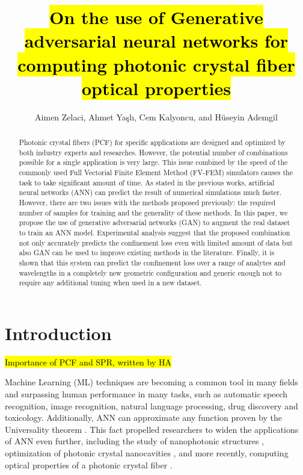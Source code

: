 \documentclass[10pt]{IEEEtran}
\begin{document}
\title{\hl{On the use of Generative adversarial neural networks for computing photonic crystal fiber optical properties}}

\author{Aimen Zelaci, Ahmet Yaşlı, Cem Kalyoncu, and Hüseyin Ademgil}

\maketitle
	
\begin{abstract}
Photonic crystal fibers (PCF) for specific applications are designed and optimized by both industry experts and researches. However, the potential number of combinations possible for a single application is very large. This issue combined by the speed of the commonly used Full Vectorial Finite Element Method (FV-FEM) simulators causes the task to take significant amount of time. As stated in the previous works, artificial neural networks (ANN) can predict the result of numerical simulations much faster. However, there are two issues with the methods proposed previously: the required number of samples for training and the generality of these methods. In this paper, we  propose the use of generative adversarial networks (GAN) to augment the real dataset to train an ANN model. Experimental analysis suggest that the proposed combination not only accurately predicts the confinement loss even with limited amount of data but also GAN can be used to improve existing methods in the literature. Finally, it is shown that this system can predict the confinement loss over a range of analytes and wavelengths in a completely new geometric configuration and generic enough not to require any additional tuning when used in a new dataset.
\end{abstract}

\section{Introduction}

\hl{Importance of PCF and SPR, written by HA}
	
Machine Learning (ML) techniques are becoming a common tool in many fields and surpassing human performance in many tasks, such as automatic speech recognition, image recognition, natural language processing, drug discovery and toxicology. Additionally, ANN can approximate any function proven by the Universality theorem \cite{HORNIK1991251}. This fact propelled researchers to widen the applications of ANN even further, including the study of nanophotonic structures \cite{kiarashinejad2020knowledge}, optimization of photonic crystal nanocavities \cite{asano2018optimization}, and more recently, computing optical properties of a photonic crystal fiber \cite{paper0}.
\end{document}
